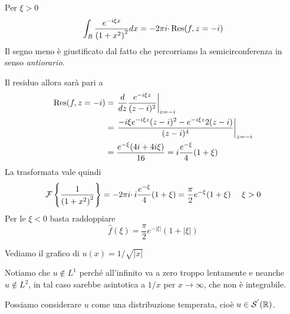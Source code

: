 Per $\xi  >0$
\begin{equation*}
\int _{R}\frac{e^{-i\xi x}}{\left( 1+x^{2}\right)^{2}} dx=-2\pi i\cdotp \operatorname{Res} ( f,z=-i)
\end{equation*}
Il segno meno è giustificato dal fatto che percorriamo la semicirconferenza in senso \textit{antiorario}.

Il residuo allora sarà pari a
\begin{equation*}
\begin{aligned}
\operatorname{Res} ( f,z=-i) & =\left. \frac{d}{dz}\frac{e^{-i\xi z}}{( z-i)^{2}}\right| _{z=-i}\\
 & =\left. \frac{-i\xi e^{-i\xi z}( z-i)^{2} -e^{-i\xi z} 2(z-i)}{( z-i)^{4}}\right| _{z=-i}\\
 & =\frac{e^{-\xi }( 4i+4i\xi )}{16} =i\frac{e^{-\xi }}{4} (1+\xi )
\end{aligned}
\end{equation*}
La trasformata vale quindi
\begin{equation*}
\mathcal{F} \left\{\frac{1}{\left( 1+x^{2}\right)^{2}}\right\} =-2\pi i\cdotp i\frac{e^{-\xi }}{4} (1+\xi )=\frac{\pi }{2} e^{-\xi }( 1+\xi ) \ \ \ \ \xi  >0
\end{equation*}
Per le $\xi < 0$ basta raddoppiare
\begin{equation*}
\hat{f}( \xi ) =\frac{\pi }{2} e^{-| \xi | } (1+| \xi | )
\end{equation*}
\Soluzione

Vediamo il grafico di $u(x)=1/\sqrt{|x|}$


Notiamo che $u\notin L^{1}$ perché all'infinito va a zero troppo lentamente e neanche $u\notin L^{2}$, in tal caso sarebbe asintotica a $1/x$ per $x\rightarrow \infty $, che non è integrabile.

Possiamo considerare $u$ come una distribuzione temperata, cioè $u\in \mathcal{S} ^{'}(\mathbb{R} )$.

